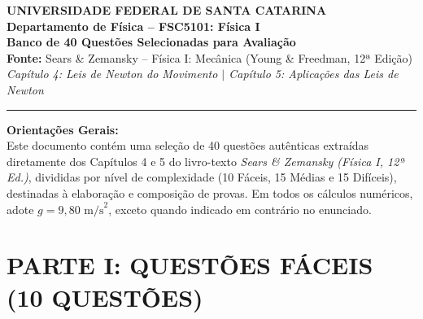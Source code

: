 \documentclass[11pt,a4paper]{article}
\begin{document}
\begin{center}
    {\LARGE \textbf{UNIVERSIDADE FEDERAL DE SANTA CATARINA}}\\[0.2cm]
    {\large \textbf{Departamento de Física -- FSC5101: Física I}}\\[0.3cm]
    {\Large \textbf{Banco de 40 Questões Selecionadas para Avaliação}}\\[0.2cm]
    {\normalsize \textbf{Fonte:} Sears \& Zemansky -- Física I: Mecânica (Young \& Freedman, 12ª Edição)}\\[0.1cm]
    {\small \textit{Capítulo 4: Leis de Newton do Movimento \quad $\vert$ \quad Capítulo 5: Aplicações das Leis de Newton}}\\[0.2cm]
    \rule{\textwidth}{0.8pt}
\end{center}

\vspace{0.2cm}
\noindent
\textbf{Orientações Gerais:}\\
Este documento contém uma seleção de 40 questões autênticas extraídas diretamente dos Capítulos 4 e 5 do livro-texto \textit{Sears \& Zemansky (Física I, 12ª Ed.)}, divididas por nível de complexidade (10 Fáceis, 15 Médias e 15 Difíceis), destinadas à elaboração e composição de provas. Em todos os cálculos numéricos, adote $g = 9,80\text{ m/s}^2$, exceto quando indicado em contrário no enunciado.

\vspace{0.4cm}

\section*{PARTE I: QUESTÕES FÁCEIS (10 QUESTÕES)}
\end{document}

